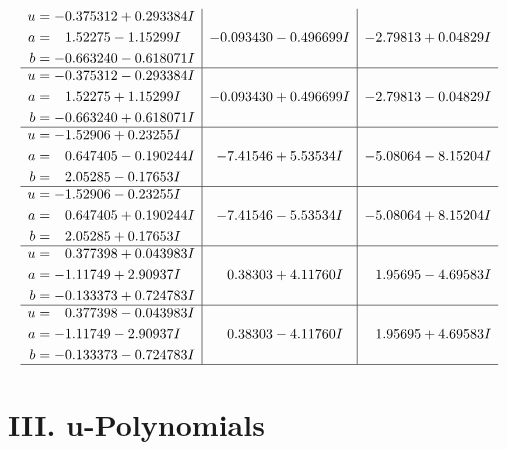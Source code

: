 \documentclass[1p]{elsarticle_modified}
\theoremstyle{definition}
\begin{document}
$$\begin{array}{c|c|c}
\begin{aligned}
u &= -0.375312 + 0.293384 I \\
a &= \phantom{-}1.52275 - 1.15299 I \\
b &= -0.663240 - 0.618071 I\end{aligned}
 & -0.093430 - 0.496699 I & -2.79813 + 0.04829 I \\ \hline\begin{aligned}
u &= -0.375312 - 0.293384 I \\
a &= \phantom{-}1.52275 + 1.15299 I \\
b &= -0.663240 + 0.618071 I\end{aligned}
 & -0.093430 + 0.496699 I & -2.79813 - 0.04829 I \\ \hline\begin{aligned}
u &= -1.52906 + 0.23255 I \\
a &= \phantom{-}0.647405 - 0.190244 I \\
b &= \phantom{-}2.05285 - 0.17653 I\end{aligned}
 & -7.41546 + 5.53534 I & -5.08064 - 8.15204 I \\ \hline\begin{aligned}
u &= -1.52906 - 0.23255 I \\
a &= \phantom{-}0.647405 + 0.190244 I \\
b &= \phantom{-}2.05285 + 0.17653 I\end{aligned}
 & -7.41546 - 5.53534 I & -5.08064 + 8.15204 I \\ \hline\begin{aligned}
u &= \phantom{-}0.377398 + 0.043983 I \\
a &= -1.11749 + 2.90937 I \\
b &= -0.133373 + 0.724783 I\end{aligned}
 & \phantom{-}0.38303 + 4.11760 I & \phantom{-}1.95695 - 4.69583 I \\ \hline\begin{aligned}
u &= \phantom{-}0.377398 - 0.043983 I \\
a &= -1.11749 - 2.90937 I \\
b &= -0.133373 - 0.724783 I\end{aligned}
 & \phantom{-}0.38303 - 4.11760 I & \phantom{-}1.95695 + 4.69583 I\\
 \hline 
 \end{array}$$\newpage
\newpage\renewcommand{\arraystretch}{1}
\centering \section*{ III. u-Polynomials}
\end{document}
